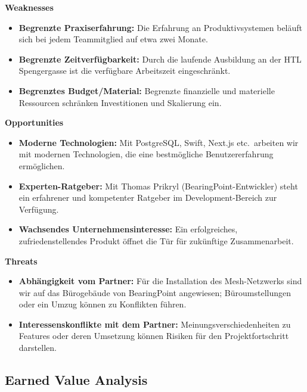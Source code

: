\documentclass{article}
\begin{document}
\noindent\textbf{Weaknesses}
\begin{itemize}
  \item \textbf{Begrenzte Praxiserfahrung:} Die Erfahrung an Produktivsystemen beläuft sich bei jedem Teammitglied auf etwa zwei Monate.
  \item \textbf{Begrenzte Zeitverfügbarkeit:} Durch die laufende Ausbildung an der HTL Spengergasse ist die verfügbare Arbeitszeit eingeschränkt.
  \item \textbf{Begrenztes Budget/Material:} Begrenzte finanzielle und materielle Ressourcen schränken Investitionen und Skalierung ein.
\end{itemize}

\noindent\textbf{Opportunities}
\begin{itemize}
  \item \textbf{Moderne Technologien:} Mit PostgreSQL, Swift, Next.js etc.\ arbeiten wir mit modernen Technologien, die eine bestmögliche Benutzererfahrung ermöglichen.
  \item \textbf{Experten-Ratgeber:} Mit Thomas Prikryl (BearingPoint-Entwickler) steht ein erfahrener und kompetenter Ratgeber im Development-Bereich zur Verfügung.
  \item \textbf{Wachsendes Unternehmensinteresse:} Ein erfolgreiches, zufriedenstellendes Produkt öffnet die Tür für zukünftige Zusammenarbeit.
\end{itemize}

\noindent\textbf{Threats}
\begin{itemize}
  \item \textbf{Abhängigkeit vom Partner:} Für die Installation des Mesh-Netzwerks sind wir auf das Bürogebäude von BearingPoint angewiesen; Büroumstellungen oder ein Umzug können zu Konflikten führen.
  \item \textbf{Interessenskonflikte mit dem Partner:} Meinungsverschiedenheiten zu Features oder deren Umsetzung können Risiken für den Projektfortschritt darstellen.
\end{itemize}







\subsection{Earned Value Analysis}
\end{document}
